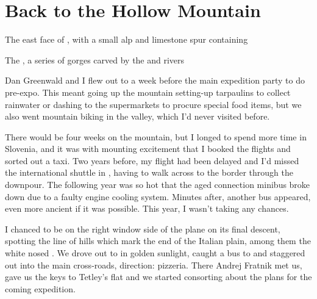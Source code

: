 \section{Back to the Hollow Mountain}
     \begin{marginfigure}
        \centering
        \caption{The east face of \protect{}, with a small alp and limestone spur containing \protect{} } \label{Krn}
    \end{marginfigure}
   \vspace{30pt}
    \begin{marginfigure}
        \centering
        \caption{ The \protect{}, a series of gorges carved by the \protect{} and \protect{} rivers } \label{Tolminka Gorge}
    \end{marginfigure}
Dan Greenwald and I flew out to  a week before the main expedition party to do pre-expo. This meant going up the mountain setting-up tarpaulins to collect rainwater or dashing to the supermarkets to procure special food items, but we also went mountain biking in the  valley, which I'd never visited before.

 There would be four weeks on the mountain, but I longed to spend more time in Slovenia, and it was with mounting excitement that I booked the flights and sorted out a taxi. Two years before, my flight had been delayed and I'd missed the international shuttle in , having to walk across to the border through the downpour. The following year was so hot that the aged connection minibus broke down due to a faulty engine cooling system. Minutes after, another bus appeared, even more ancient if it was possible. This year, I wasn't taking any chances.

I chanced to be on the right window side of the plane on its final descent, spotting the line of hills which mark the end of the Italian plain, among them the white nosed . We drove out to  in golden sunlight, caught a bus to  and staggered out into the main  cross-roads, direction: pizzeria. There Andrej Fratnik met us, gave us the keys to Tetley's flat and we started consorting about the plans for the coming expedition. 


